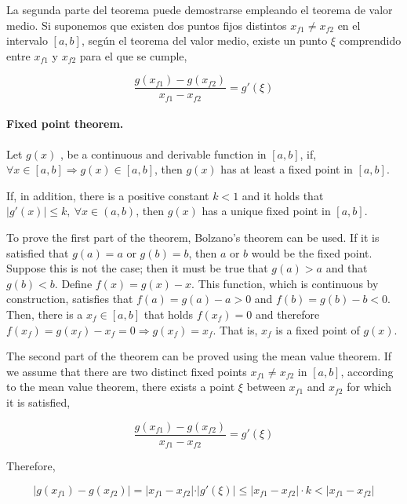 \begin{paracol}{2}
La segunda parte del teorema puede demostrarse empleando el teorema de valor medio. Si suponemos  que existen dos puntos fijos distintos $x_{f1} \neq x_{f2}$ en el intervalo $[a,b]$, según el teorema del valor medio, existe un punto $\xi$ comprendido entre $x_{f1}$ y $ x_{f2}$ para el que se cumple,

\begin{equation*}
\frac{g(x_{f1})-g(x_{f2})}{x_{f1}-x_{f2}}=g'(\xi)
\end{equation*}
\switchcolumn

\paragraph{Fixed point theorem.} Let $g(x)$ , be a continuous and derivable function in $[a, b]$, if, $\forall x \in [a, b] \Rightarrow g(x)\in [a,b]$,  then $g(x)$ has at least a fixed point in $[a, b]$. 

If, in addition, there is a positive constant $k < 1$  and it holds that  $\vert g'(x) \vert \leq k, \  \forall x \in (a, b)$, then $g(x)$ has a unique fixed point in $[a,b]$. 

To prove the first part of the theorem, Bolzano's theorem can be used. If it is satisfied that $g(a)=a$ or $g(b)=b$, then $a$ or $b$ would be the fixed point. Suppose this is not the case; then it must be true that $g(a)>a$ and that $g(b)<b$. Define $f(x)=g(x)-x$. This function, which is continuous by construction, satisfies that $f(a)=g(a)-a>0$ and $f(b)=g(b)-b<0$. Then, there is a $x_f \in [a, b]$ that holds $f(x_f)=0$ and therefore $f(x_f)=g(x_f)-x_f=0 \Rightarrow g(x_f)=x_f$. That is, $x_f$ is a fixed point of $g(x)$.

The second part of the theorem can be proved using the mean value theorem. If we assume that there are two distinct fixed points $x_{f1} \neq x_{f2}$ in $[a,b]$, according to the mean value theorem, there exists a point $\xi$ between $x_{f1}$ and $x_{f2}$ for which it is satisfied,

\begin{equation*}
\frac{g(x_{f1})-g(x_{f2})}{x_{f1}-x_{f2}}=g'(\xi)
\end{equation*}

Therefore,
\end{paracol}


\begin{equation*}
\vert g(x_{f1})-g(x_{f2}) \vert =\vert x_{f1}-x_{f2} \vert\cdot \vert g'(\xi) \vert \leq \vert x_{f1}-x_{f2} \vert \cdot k < \vert x_{f1}-x_{f2} \vert 
\end{equation*}

